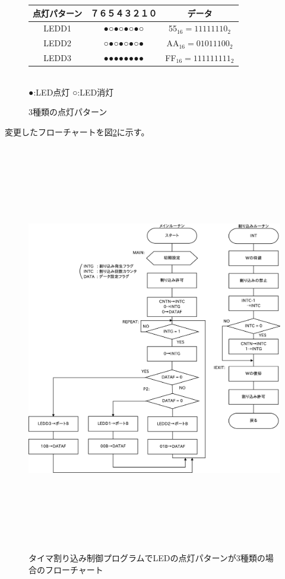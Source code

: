 \documentclass[a4paper,12pt]{ujarticle}
\begin{document}
   \begin{figure}[htbp]
    \begin{center}
       \begin{tabular}{c|c|c}\hline
点灯パターン&７６５４３２１０ & データ \\ \hline
      LEDD1 &●○●○●○●○ & 55$_{16}=11111110_2$ \\
      LEDD2 &○●○●○●○● & AA$_{16}=01011100_2$ \\
      LEDD3 &●●●●●●●● & FF$_{16}=111111111_2$\\ \hline
       \end{tabular}\\
      ●:LED点灯 ○:LED消灯
    \end{center}
    \caption{3種類の点灯パターン}
    \label{fig:timer-LED3pattern}
\end{figure}

変更したフローチャートを図\ref{fig:flow_5-14-1}に示す。
  \begin{figure}[htbp]
    \begin{center}
     \includegraphics[height=180mm]{Diagram5-14-1.eps}
    \end{center}
   \caption{タイマ割り込み制御プログラムでLEDの点灯パターンが3種類の場合のフローチャート}
   \label{fig:flow_5-14-1}
  \end{figure}
\end{document}
